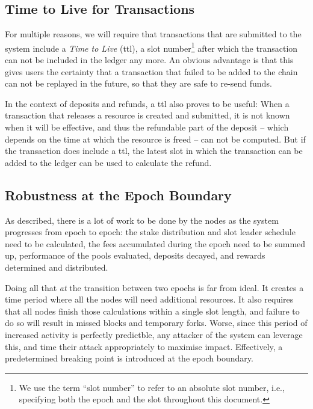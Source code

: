 \documentclass[11pt,a4paper,dvipsnames,twosided]{article}
\begin{document}
\subsection{Time to Live for Transactions}
\label{time-to-live-for-transactions}

For multiple reasons, we will require that transactions that are submitted to
the system include a \emph{Time to Live} (ttl), a slot number\footnote{We use
  the term ``slot number'' to refer to an absolute slot number, i.e., specifying
  both the epoch and the slot throughout this document.} after which the
transaction can not be included in the ledger any more. An obvious advantage is
that this gives users the certainty that a transaction that failed to be added
to the chain can not be replayed in the future, so that they are safe to re-send
funds.

In the context of deposits and refunds, a ttl also proves to be useful: When a
transaction that releases a resource is created and submitted, it is not known
when it will be effective, and thus the refundable part of the deposit -- which
depends on the time at which the resource is freed -- can not be computed. But
if the transaction does include a ttl, the latest slot in which the transaction
can be added to the ledger can be used to calculate the refund.

\subsection{Robustness at the Epoch Boundary}
\label{robustness-at-the-epoch-boundary}

As described, there is a lot of work to be done by the nodes as the system
progresses from epoch to epoch: the stake distribution and slot leader schedule
need to be calculated, the fees accumulated during the epoch need to be
summed up, performance of the pools evaluated, deposits decayed, and
rewards determined and distributed.

Doing all that \emph{at} the transition between two epochs is far from ideal. It
creates a time period where all the nodes will need additional resources. It
also requires that all nodes finish those calculations within a single slot
length, and failure to do so will result in missed blocks and temporary forks.
Worse, since this period of increased activity is perfectly predictble, any
attacker of the system can leverage this, and time their attack appropriately to
maximise impact. Effectively, a predetermined breaking point is introduced at
the epoch boundary.
\end{document}
